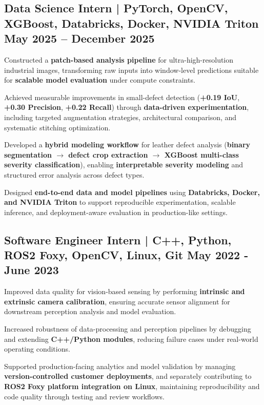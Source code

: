 
\subsection{{Data Science Intern |  PyTorch, OpenCV, XGBoost, Databricks, Docker, NVIDIA Triton \hfill May 2025 -- December 2025}}
\begin{zitemize}
    \item Constructed a \textbf{patch-based analysis pipeline} for ultra-high-resolution industrial images, transforming raw inputs into window-level predictions suitable for \textbf{scalable model evaluation} under compute constraints.

    \item Achieved measurable improvements in small-defect detection (\textbf{+0.19 IoU}, \textbf{+0.30 Precision}, \textbf{+0.22 Recall}) through \textbf{data-driven experimentation}, including targeted augmentation strategies, architectural comparison, and systematic stitching optimization.

    \item Developed a \textbf{hybrid modeling workflow} for leather defect analysis (\textbf{binary segmentation $\rightarrow$ defect crop extraction $\rightarrow$ XGBoost multi-class severity classification}), enabling \textbf{interpretable severity modeling} and structured error analysis across defect types.

    \item Designed \textbf{end-to-end data and model pipelines} using \textbf{Databricks, Docker, and NVIDIA Triton} to support reproducible experimentation, scalable inference, and deployment-aware evaluation in production-like settings.
\end{zitemize}





\subsection{{Software Engineer Intern | C++, Python, ROS2 Foxy, OpenCV, Linux, Git \hfill May 2022 - June 2023}}
\begin{zitemize}
    \item Improved data quality for vision-based sensing by performing \textbf{intrinsic and extrinsic camera calibration}, ensuring accurate sensor alignment for downstream perception analysis and model evaluation.

    \item Increased robustness of data-processing and perception pipelines by debugging and extending \textbf{C++/Python modules}, reducing failure cases under real-world operating conditions.

    \item Supported production-facing analytics and model validation by managing \textbf{version-controlled customer deployments}, and separately contributing to \textbf{ROS2 Foxy platform integration on Linux}, maintaining reproducibility and code quality through testing and review workflows.
\end{zitemize}




